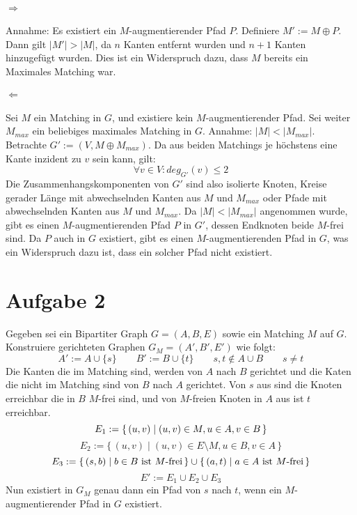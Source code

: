 \documentclass[10pt,a4paper]{article}
\begin{document}
\paragraph{$\Rightarrow$}
Annahme: Es existiert ein $M$-augmentierender Pfad $P$.
Definiere $M' := M \oplus P$. Dann gilt $|M'| > |M|$, da $n$ Kanten entfernt wurden und $n+1$ Kanten hinzugef\"ugt wurden.
Dies ist ein Widerspruch dazu, dass $M$ bereits ein Maximales Matching war.

\paragraph{$\Leftarrow$}
Sei $M$ ein Matching in $G$, und existiere kein $M$-augmentierender Pfad. Sei weiter $M_{max}$ ein beliebiges maximales Matching in $G$. Annahme: $|M| < |M_{max}|$.
Betrachte $G' := (V, M \oplus M_{max})$. Da aus beiden Matchings je h\"ochstens eine Kante inzident zu $v$ sein kann, gilt:
\begin{equation*}
\forall v \in V : deg_{G'}(v) \leq 2
\end{equation*}
Die Zusammenhangskomponenten von $G'$ sind also isolierte Knoten, Kreise gerader L\"ange mit abwechselnden Kanten aus $M$ und $M_{max}$ oder Pfade mit abwechselnden Kanten aus $M$ und $M_{max}$.
Da $|M| < |M_{max}|$ angenommen wurde, gibt es einen $M$-augmentierenden Pfad $P$ in $G'$, dessen Endknoten beide $M$-frei sind. Da $P$ auch in $G$ existiert, gibt es einen $M$-augmentierenden Pfad in $G$, was ein Widerspruch dazu ist, dass ein solcher Pfad nicht existiert.

\section*{Aufgabe 2}
Gegeben sei ein Bipartiter Graph $G = (A, B, E)$ sowie ein Matching $M$ auf $G$. Konstruiere gerichteten Graphen $G_M = (A', B', E')$ wie folgt:
\begin{equation*}
A' := A \cup \{s\}  \qquad B':=B \cup \{t\} \qquad s,t \notin A \cup B \qquad s \neq t
\end{equation*}
Die Kanten die im Matching sind, werden von $A$ nach $B$ gerichtet und die Katen die nicht im Matching sind von $B$ nach $A$ gerichtet. Von $s$ aus sind die Knoten erreichbar die in $B$ $M$-frei sind, und von $M$-freien Knoten in $A$ aus ist $t$ erreichbar.
\begin{equation*}
E_1 := \{ \, (u, v) \mid (u, v) \in M, u \in A, v \in B \, \} \\
\end{equation*}
\begin{equation*}
E_2 := \{ \, (u, v) \mid (u, v) \in E \setminus M, u \in B, v \in A \, \}
\end{equation*}
\begin{equation*}
E_3 := \{ \, (s, b) \mid b \in B \textnormal{ ist $M$-frei} \, \} \cup \{ \, (a, t) \mid a \in A \textnormal{ ist $M$-frei} \, \}
\end{equation*}
\begin{equation*}
E' := E_1 \cup E_2 \cup E_3
\end{equation*}
Nun existiert in $G_M$ genau dann ein Pfad von $s$ nach $t$, wenn ein $M$-augmentierender Pfad in $G$ existiert.
\end{document}
